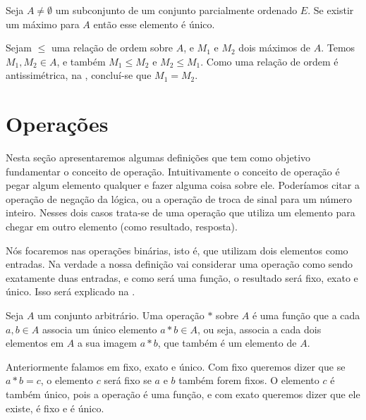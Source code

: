 \documentclass[../main.tex]{subfiles}
\begin{document}
\begin{teo}\label{agb-teo-maximoUnico}
    Seja $A \neq \emptyset$ um subconjunto de um conjunto parcialmente ordenado $E$. Se existir um máximo para $A$ então esse elemento é único.
\end{teo} 
\begin{dem}
    Sejam $\leq$ uma relação de ordem sobre $A$, e $M_1$ e $M_2$ dois máximos de $A$. Temos $M_1, M_2 \in A$, e também $M_1 \leq M_2$  e $M_2 \leq M_1$. Como uma relação de ordem é antissimétrica, na , concluí-se que $M_1 = M_2$.
\end{dem}




\section{Operações}

Nesta seção apresentaremos algumas definições que tem como objetivo fundamentar o conceito de operação. Intuitivamente o conceito de operação é pegar algum elemento qualquer e fazer alguma coisa sobre ele. Poderíamos citar a operação de negação da lógica, ou a operação de troca de sinal para um número inteiro. Nesses dois casos trata-se de uma operação que utiliza um elemento para chegar em outro elemento (como resultado, resposta).

Nós focaremos nas operações binárias, isto é, que utilizam dois elementos como entradas. Na verdade a nossa definição vai considerar uma operação como sendo exatamente duas entradas, e como será uma função, o resultado será fixo, exato e único. Isso será explicado na .

\begin{defi}\label{agb-def-operacao}
    Seja $A$ um conjunto arbitrário. Uma operação $*$ sobre $A$ é uma função que a cada $a,b \in A$ associa um único elemento $a * b \in A$, ou seja, associa a cada dois elementos em $A$ a sua imagem $a * b$, que também é um elemento de $A$.
\end{defi}

\begin{obs}\label{agb-obs-operacao}
    Anteriormente falamos em fixo, exato e único. Com fixo queremos dizer que se $a*b = c$, o elemento $c$ será fixo se $a$ e $b$ também forem fixos. O elemento $c$ é também único, pois a operação é uma função, e com exato queremos dizer que ele existe, é fixo e é único. 
\end{obs}
\end{document}
